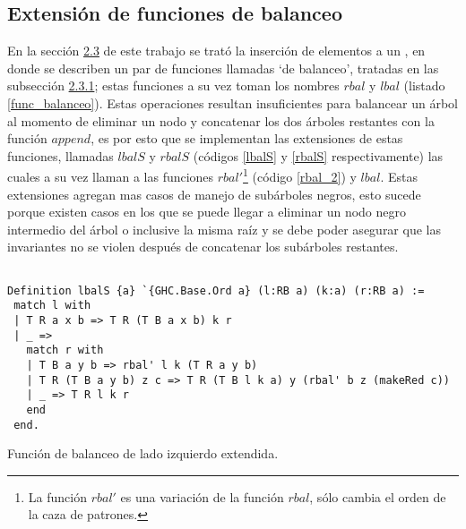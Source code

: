 \subsection{Extensi\'on de funciones de balanceo}

En la secci\'on \hyperref[sec_ins]{2.3} de este trabajo se trat\'o la inserci\'on de elementos a un {\arn}, en donde se
describen un par de funciones llamadas `de balanceo', tratadas en las subsecci\'on \hyperref[subsec_bal]{2.3.1}; estas 
funciones a su vez toman los nombres \hyperref[func_balanceo]{$rbal$} y 
\hyperref[func_balanceo]{$lbal$} (listado \ref{func_balanceo}). Estas operaciones resultan 
insuficientes para balancear un \'arbol al momento de eliminar un nodo y concatenar los dos 
\'arboles restantes con la función \hyperref[func_app]{$append$}, es por esto que se implementan las
extensiones de estas funciones, llamadas \hyperref[lbalS]{$lbalS$} y \hyperref[lbalS]{$rbalS$} 
(c\'odigos \ref{lbalS} y \ref{rbalS} respectivamente) las cuales a su vez llaman a las funciones 
\hyperref[rbal_2]{$rbal'$}\footnote{La funci\'on \hyperref[rbal_2]{$rbal'$} es una variación de la 
función \hyperref[func_balanceo]{$rbal$}, s\'olo cambia el orden de la caza de patrones.} (c\'odigo
\ref{rbal_2}) y \hyperref[func_balanceo]{$lbal$}. Estas extensiones agregan mas casos de manejo de 
subárboles negros, esto sucede porque existen casos en los que se puede llegar a eliminar un nodo 
negro intermedio del \'arbol o inclusive la misma ra\'iz y se debe poder asegurar que las invariantes 
no se violen después de concatenar los subárboles restantes.

\begin{listing}[!ht]
\centering
\captionsetup{justification=centering}
\begin{verbatim}

Definition lbalS {a} `{GHC.Base.Ord a} (l:RB a) (k:a) (r:RB a) :=
 match l with
 | T R a x b => T R (T B a x b) k r
 | _ =>
   match r with
   | T B a y b => rbal' l k (T R a y b)
   | T R (T B a y b) z c => T R (T B l k a) y (rbal' b z (makeRed c))
   | _ => T R l k r
   end
 end.

\end{verbatim}
\caption{Funci\'on de balanceo de lado izquierdo extendida.}
\label{lbalS}
\end{listing}

